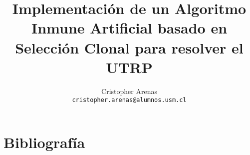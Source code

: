 \documentclass{llncs}
\title{Implementación de un Algoritmo Inmune Artificial basado en Selección Clonal para resolver el UTRP}
\author{Cristopher Arenas\\\texttt{cristopher.arenas@alumnos.usm.cl}}
\institute{Departamento de Informática\\Universidad Técnica Federico Santa María}
\begin{document}
\maketitle












%


\section{Bibliograf\'ia}


\end{document}
